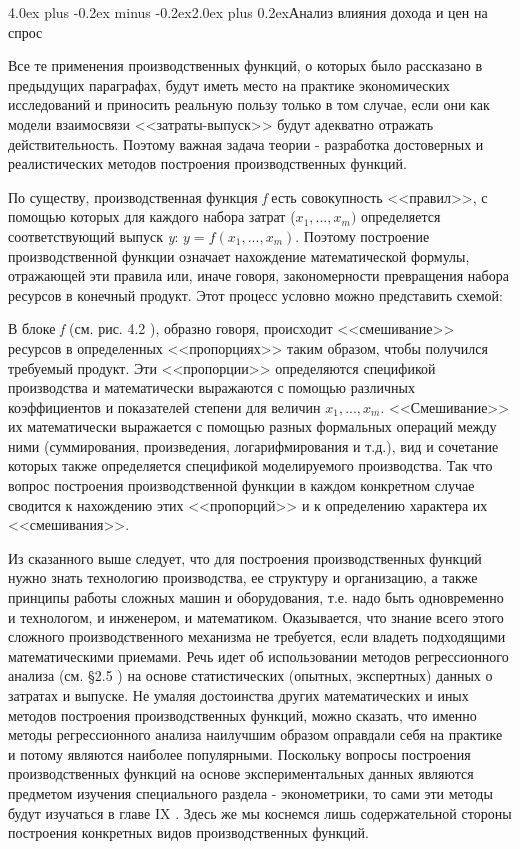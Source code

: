 \documentclass[12pt, 4paper]{book}
\makeatletter
\renewcommand{\section}{\@startsection{section}{1}{1pt}%
	{4.0ex plus -0.2ex minus -0.2ex}{2.0ex plus 0.2ex}{\centering\bf}}%
\makeatother
\begin{document}
{\begin{center}
\section{Анализ влияния дохода и цен на спрос}
\end{center}
\par

Все те применения производственных функций, о которых было рассказано в предыдущих параграфах, будут иметь место на практике экономических исследований и приносить реальную пользу только в том случае, если они как модели взаимосвязи <<затраты-выпуск>> будут адекватно отражать действительность. Поэтому важная задача теории - разработка достоверных и реалистических методов построения производственных функций. 
\par

По существу, производственная функция \textit{f} есть совокупность <<правил>>, с помощью которых для каждого набора затрат ($x_1,...,x_m)$ определяется соответствующий выпуск \textit{y}: $y=f(x_1,...,x_m)$. Поэтому построение производственной функции означает нахождение математической формулы, отражающей эти правила или, иначе говоря, закономерности превращения набора ресурсов в конечный продукт. Этот процесс условно можно представить схемой: 
\par

В блоке \textit{f} (см. рис. 4.2 ), образно говоря, происходит <<смешивание>> ресурсов  в определенных <<пропорциях>> таким образом, чтобы получился требуемый продукт. Эти <<пропорции>> определяются спецификой производства и математически выражаются с помощью различных коэффициентов и показателей степени для величин $x_1,...,x_m$. <<Смешивание>> их математически выражается с помощью разных формальных операций между ними (суммирования, произведения, логарифмирования и т.д.), вид и сочетание которых также определяется спецификой моделируемого производства. Так что вопрос построения производственной функции в каждом конкретном случае сводится к нахождению этих <<пропорций>> и к определению характера их <<смешивания>>. 
\par

Из сказанного выше следует, что для построения производственных функций нужно знать технологию производства, ее структуру и организацию, а также принципы работы сложных машин и оборудования, т.е. надо быть одновременно и технологом, и инженером, и математиком. Оказывается, что знание всего этого сложного производственного механизма не требуется, если владеть подходящими математическими приемами. Речь идет об использовании методов регрессионного анализа (см. §2.5 ) на основе статистических (опытных, экспертных) данных о затратах и выпуске. Не умаляя достоинства других математических и иных методов построения производственных функций, можно сказать, что именно методы регрессионного анализа наилучшим образом оправдали себя на практике и потому являются наиболее популярными. Поскольку вопросы построения производственных функций на основе экспериментальных данных являются предметом изучения специального раздела - эконометрики, то сами эти методы будут изучаться в главе IX . Здесь же мы коснемся лишь содержательной стороны построения конкретных видов производственных функций. 
\par

}
\end{document}

